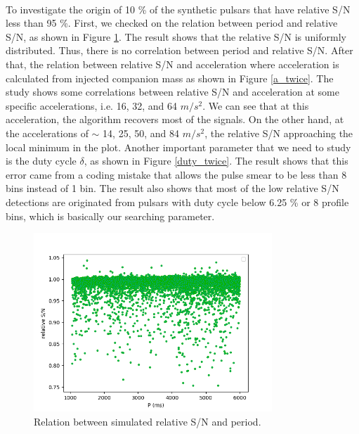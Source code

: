 \documentclass[thesis_msc.tex]{subfiles}
\begin{document}
 \paragraph{} To investigate the origin of 10 \% of the synthetic pulsars that have relative S/N less than 95 \%. First, we checked on the relation between period and relative S/N, as shown in Figure \ref{P_twice}. The result shows that the relative S/N is uniformly distributed. Thus, there is no correlation between period and relative S/N.  After that, the relation between relative S/N and acceleration where acceleration is calculated from injected companion mass as shown in Figure \ref{a_twice}. The study shows some correlations between relative S/N and acceleration at some specific accelerations, i.e. 16, 32, and 64 $m/s^2$. We can see that at this acceleration, the algorithm recovers most of the signals. On the other hand, at the accelerations of $\sim$ 14, 25, 50, and 84 $m/s^2$, the relative S/N approaching the local minimum in the plot. Another important parameter that we need to study is the duty cycle $\delta$, as shown in Figure \ref{duty_twice}. The result shows that this error came from a coding mistake that allows the pulse smear to be less than 8 bins instead of 1 bin. The result also shows that most of the low relative S/N detections are originated from pulsars with duty cycle below 6.25 \% or 8 profile bins, which is basically our searching parameter.   
 



 \begin{figure}[h]
\centering
\includegraphics[width=0.80\textwidth]{figures/P_twice}
\caption{Relation between simulated relative S/N and period.  }\label{P_twice}
\end{figure}
\end{document}
